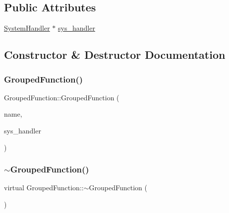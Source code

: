 \subsection*{Public Attributes}
\begin{DoxyCompactItemize}
\item 
\hyperlink{classSystemHandler}{System\+Handler} $\ast$ \hyperlink{classGroupedFunction_a932d46ac0e35f1a1c989427e51c1b2b4}{sys\+\_\+handler}
\end{DoxyCompactItemize}


\subsection{Constructor \& Destructor Documentation}
\mbox{\label{classGroupedFunction_a613f536552aeb5b85e363d8f5b24a87f}} 
\subsubsection{\texorpdfstring{Grouped\+Function()}{GroupedFunction()}}
{\footnotesize\ttfamily Grouped\+Function\+::\+Grouped\+Function (\begin{DoxyParamCaption}\item[{std\+::string}]{name,  }\item[{\hyperlink{classSystemHandler}{System\+Handler} $\ast$}]{sys\+\_\+handler }\end{DoxyParamCaption})}

\mbox{\label{classGroupedFunction_a5f3c1ed74083a0b9f1dea5ae2f287e70}} 
\subsubsection{\texorpdfstring{$\sim$\+Grouped\+Function()}{~GroupedFunction()}}
{\footnotesize\ttfamily virtual Grouped\+Function\+::$\sim$\+Grouped\+Function (\begin{DoxyParamCaption}{ }\end{DoxyParamCaption})\hspace{0.3cm}{\ttfamily [virtual]}}




